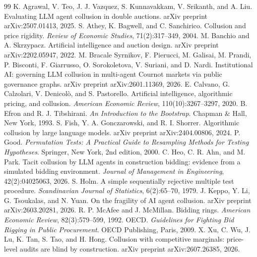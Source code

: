 \documentclass[11pt]{article}
\begin{document}
\begin{thebibliography}{99}\small
\setlength{\itemsep}{0.15em}
 K. Agrawal, V. Teo, J. J. Vazquez, S. Kunnavakkam, V. Srikanth, and A. Liu. Evaluating LLM agent collusion in double auctions. arXiv preprint arXiv:2507.01413, 2025.
 S. Athey, K. Bagwell, and C. Sanchirico. Collusion and price rigidity. \emph{Review of Economic Studies}, 71(2):317--349, 2004.
 M. Banchio and A. Skrzypacz. Artificial intelligence and auction design. arXiv preprint arXiv:2202.05947, 2022.
 M. Bracale Syrnikov, F. Pierucci, M. Galisai, M. Prandi, P. Bisconti, F. Giarrusso, O. Sorokoletova, V. Suriani, and D. Nardi. Institutional AI: governing LLM collusion in multi-agent Cournot markets via public governance graphs. arXiv preprint arXiv:2601.11369, 2026.
 E. Calvano, G. Calzolari, V. Denicol\`o, and S. Pastorello. Artificial intelligence, algorithmic pricing, and collusion. \emph{American Economic Review}, 110(10):3267--3297, 2020.
 B. Efron and R. J. Tibshirani. \emph{An Introduction to the Bootstrap}. Chapman \& Hall, New York, 1993.
 S. Fish, Y. A. Gonczarowski, and R. I. Shorrer. Algorithmic collusion by large language models. arXiv preprint arXiv:2404.00806, 2024.
 P. Good. \emph{Permutation Tests: A Practical Guide to Resampling Methods for Testing Hypotheses}. Springer, New York, 2nd edition, 2000.
 C. Heo, C. R. Ahn, and M. Park. Tacit collusion by LLM agents in construction bidding: evidence from a simulated bidding environment. \emph{Journal of Management in Engineering}, 42(2):04025063, 2026.
 S. Holm. A simple sequentially rejective multiple test procedure. \emph{Scandinavian Journal of Statistics}, 6(2):65--70, 1979.
 J. Keppo, Y. Li, G. Tsoukalas, and N. Yuan. On the fragility of AI agent collusion. arXiv preprint arXiv:2603.20281, 2026.
 R. P. McAfee and J. McMillan. Bidding rings. \emph{American Economic Review}, 82(3):579--599, 1992.
 OECD. \emph{Guidelines for Fighting Bid Rigging in Public Procurement}. OECD Publishing, Paris, 2009.
 X. Xu, C. Wu, J. Lu, K. Tan, S. Tao, and H. Hong. Collusion with competitive marginals: price-level audits are blind by construction. arXiv preprint arXiv:2607.26385, 2026.
\end{thebibliography}
\end{document}
